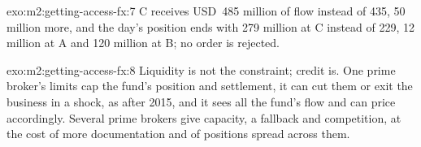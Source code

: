 \begin{solution}{exo:m2:getting-access-fx:7}
C receives USD~485 million of flow instead of 435, 50 million more, and the day's
position ends with 279 million at C instead of 229, 12 million at A and 120 million at
B; no order is rejected.
\end{solution}

\begin{solution}{exo:m2:getting-access-fx:8}
Liquidity is not the constraint; credit is. One prime broker's limits cap the fund's
position and settlement, it can cut them or exit the business in a shock, as after
2015, and it sees all the fund's flow and can price accordingly. Several prime brokers
give capacity, a fallback and competition, at the cost of more documentation and of
positions spread across them.
\end{solution}

